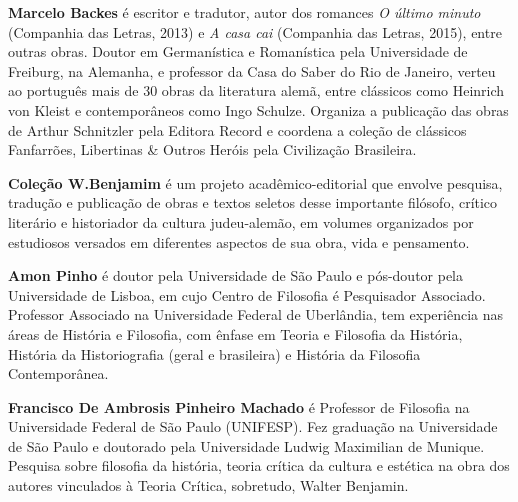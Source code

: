 \textbf{Marcelo Backes} é escritor e tradutor, autor dos romances \emph{O último minuto} (Companhia das Letras, 2013) e \emph{A casa cai} (Companhia das Letras, 2015), entre outras obras. Doutor em Germanística e Romanística pela Universidade de Freiburg, na Alemanha, e professor da Casa do Saber do Rio de Janeiro, verteu ao português mais de 30 obras da literatura alemã, entre clássicos como Heinrich von Kleist e contemporâneos como Ingo Schulze. Organiza a publicação das obras de Arthur Schnitzler pela Editora Record e coordena a coleção de clássicos Fanfarrões, Libertinas \& Outros Heróis pela Civilização Brasileira.

\textbf{Coleção W.Benjamim} é um projeto acadêmico-editorial que envolve pesquisa, tradução e publicação de obras e textos seletos desse importante filósofo, crítico literário e historiador da cultura judeu-alemão, em volumes organizados por estudiosos versados em diferentes aspectos de sua obra, vida e pensamento.

\textbf{Amon Pinho} é doutor pela Universidade de São Paulo e pós-doutor pela Universidade de Lisboa, em cujo Centro de Filosofia é Pesquisador Associado. Professor Associado na Universidade Federal de Uberlândia, tem experiência nas áreas de História e Filosofia, com ênfase em Teoria e Filosofia da História, História da Historiografia (geral e brasileira) e História da Filosofia Contemporânea.

\textbf{Francisco De Ambrosis Pinheiro Machado} é Professor de Filosofia na Universidade Federal de São Paulo (UNIFESP). Fez graduação na Universidade de São Paulo e doutorado pela Universidade Ludwig Maximilian de Munique. Pesquisa sobre filosofia da história, teoria crítica da cultura e estética na obra dos autores vinculados à Teoria Crítica, sobretudo, Walter Benjamin.


